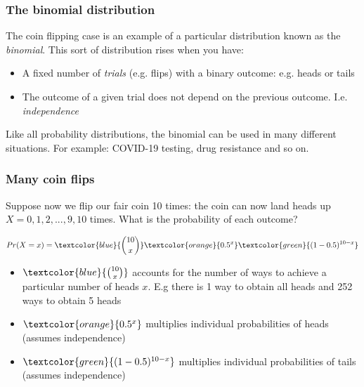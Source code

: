 \documentclass{beamer}
\begin{document}
	\begin{frame}
		\frametitle{The binomial distribution}
		The coin flipping case is an example of a particular distribution known as the \textit{binomial}. This sort of distribution rises when you have:
		
		\begin{itemize}
			\item A fixed number of \textit{trials} (e.g. flips) with a binary outcome: e.g. heads or tails
			\item The outcome of a given trial does not depend on the previous outcome. I.e. \textit{independence}
		\end{itemize}
		
		Like all probability distributions, the binomial can be used in many different situations. For example: COVID-19 testing, drug resistance and so on.
		
	\end{frame}
	
	\begin{frame}
		\frametitle{Many coin flips}
		
		Suppose now we flip our fair coin 10 times: the coin can now land heads up $X=0, 1, 2, ..., 9, 10$ times. What is the probability of each outcome?
		
		\begin{equation}
		Pr(X=x) = \textcolor{blue}{\binom{10}{x}} \textcolor{orange}{0.5^x} \textcolor{green}{(1 - 0.5)^{10-x}}
		\end{equation}
		
		\begin{itemize}
			\item $\textcolor{blue}{\binom{10}{x}}$ accounts for the number of ways to achieve a particular number of heads $x$. E.g there is 1 way to obtain all heads and 252 ways to obtain 5 heads
			\item $\textcolor{orange}{0.5^x}$ multiplies individual probabilities of heads (assumes independence)
			\item $\textcolor{green}{(1 - 0.5)^{10-x}}$ multiplies individual probabilities of tails (assumes independence)
		\end{itemize}
		
	\end{frame}
	
\end{document}
